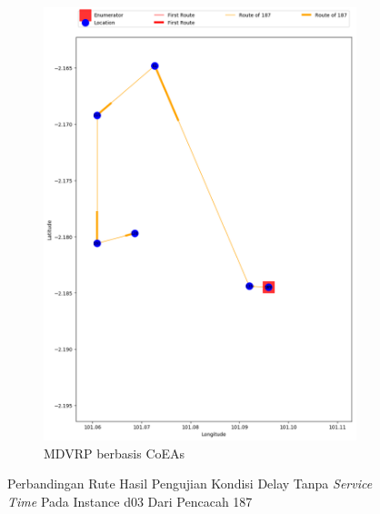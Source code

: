 \begin{figure}[H]
	\centering
	\begin{subfigure}[t]{\textwidth}
		\centering
		\includegraphics[width=\textwidth]{Resources/Images/delayed_3/real_m15_n100_delayed_3_187_coes}
		\caption{MDVRP berbasis CoEAs}
		\label{fig:real_m15_n100_delayed_3_187_coes}
	\end{subfigure}
	\caption{Perbandingan Rute Hasil Pengujian Kondisi Delay Tanpa \textit{Service Time} Pada Instance d03 Dari Pencacah 187}
	\label{fig:real_m15_n100_delayed_3_187}
\end{figure}


